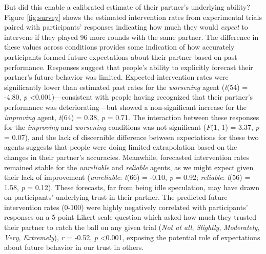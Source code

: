 \documentclass[10pt,letterpaper]{article}
\begin{document}
But did this enable a calibrated estimate of their partner's underlying ability? Figure \ref{fig:survey} shows the estimated intervention rates from experimental trials paired with participants' responses indicating how much they would \textit{expect} to intervene if they played 96 more rounds with the same partner. The difference in these values across conditions provides some indication of how accurately participants formed future expectations about their partner based on past performance. Responses suggest that people's ability to explicitly forecast their partner's future behavior was limited. Expected intervention rates were significantly lower than estimated past rates for the \textit{worsening} agent (\textit{t}(54) = -4.80, \textit{p} \textless{0.001})---consistent with people having recognized that their partner's performance was deteriorating---but showed a non-significant increase for the \textit{improving} agent, \textit{t}(64) = 0.38, \textit{p} = 0.71. The interaction between these responses for the \textit{improving} and \textit{worsening} conditions was not significant (\textit{F}(1, 1) = 3.37, \textit{p} = 0.07), and the lack of discernible difference between expectations for these two agents suggests that people were doing limited extrapolation based on the changes in their partner's accuracies. Meanwhile, forecasted intervention rates remained stable for the \textit{unreliable} and \textit{reliable} agents, as we might expect given their lack of improvement (\textit{unreliable}: \textit{t}(66) = -0.10, \textit{p} = 0.92; \textit{reliable}: \textit{t}(56) = 1.58, \textit{p} = 0.12). These forecasts, far from being idle speculation, may have drawn on participants' underlying trust in their partner. The predicted future intervention rates (0-100) were highly negatively correlated with participants' responses on a 5-point Likert scale question which asked how much they trusted their partner to catch the ball on any given trial (\textit{Not at all}, \textit{Slightly}, \textit{Moderately}, \textit{Very}, \textit{Extremely}), \textit{r} = -0.52, \textit{p} \textless{0.001}, exposing the potential role of expectations about future behavior in our trust in others.
\end{document}
